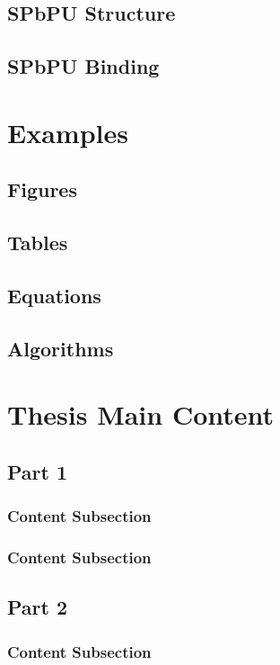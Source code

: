 \documentclass[a4paper,twoside,12pt]{book}
\begin{document}
			\section{SPbPU Structure} 
			\section{SPbPU Binding} 
		\chapter{Examples} 
			\section{Figures} 
			\section{Tables} 
			\section{Equations}  \clearpage
			\section{Algorithms} 
		\chapter{Thesis Main Content} 
			\section{Part 1}
				\subsection{Content Subsection}
				\subsection{Content Subsection}
			\section{Part 2}
				\subsection{Content Subsection}
\end{document}
